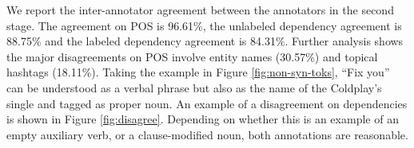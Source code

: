 \documentclass[11pt,a4paper]{article}
\newcommand{\yjcomment}[1]{\textcolor{orange}{[$_\mathrm{L}^\mathrm{Y}$#1]}}
\begin{document}
We report the inter-annotator agreement between the annotators
in the second stage. The agreement on POS is 96.61\%, the unlabeled
dependency agreement is 88.75\% and the labeled dependency agreement
is 84.31\%. Further analysis shows the major disagreements on POS
involve entity names (30.57\%) and topical hashtags (18.11\%).
Taking the example in Figure \ref{fig:non-syn-toks}, ``Fix you'' can
be understood as a verbal phrase but also as the name of the Coldplay's
single and tagged as proper noun. An example of a disagreement on
dependencies is shown in Figure \ref{fig:disagree}.  Depending on
whether this is an example of an empty auxiliary verb, or a clause-modified
noun, both annotations are reasonable. 

%
%
\end{document}
